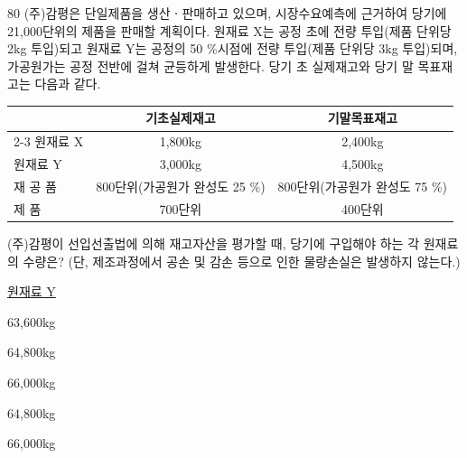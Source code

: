 \begin{question}{80}
(주)감평은 단일제품을 생산ㆍ판매하고 있으며, 시장수요예측에 근거하여 당기에 21,000단위의 제품을 판매할 계획이다. 원재료 X는 공정 초에 전량 투입(제품 단위당 2kg 투입)되고 원재료 Y는 공정의 50 \%시점에 전량 투입(제품 단위당 3kg 투입)되며, 가공원가는 공정 전반에 걸쳐 균등하게 발생한다. 당기 초 실제재고와 당기 말 목표재고는 다음과 같다.
\par
{\small\centering
\begin{tabular}{@{}lcc@{}}\hline
 & 기초실제재고 & 기말목표재고 \\\cline{2-3}
원재료 X & 1,800kg & 2,400kg \\
원재료 Y & 3,000kg & 4,500kg \\
재 공 품 & 800단위(가공원가 완성도 25 \%) & 800단위(가공원가 완성도 75 \%) \\
제 \quad 품 & 700단위 & 400단위 \\\hline
\end{tabular}\par}
(주)감평이 선입선출법에 의해 재고자산을 평가할 때, 당기에 구입해야 하는 각 원재료의 수량은? (단, 제조과정에서 공손 및 감손 등으로 인한 물량손실은 발생하지 않는다.) \par
\hspace*{2.4em}\uline{원재료 Y} \par
\begin{choices}
  \item {}63,600kg
  \item {}64,800kg
  \item {}66,000kg
  \item {}64,800kg
  \item {}66,000kg
\end{choices}
\end{question}
